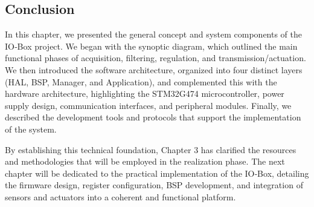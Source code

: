 \subsection{Conclusion}

In this chapter, we presented the general concept and system components of the IO‑Box project. We began with the synoptic diagram, which outlined the main functional phases of acquisition, filtering, regulation, and transmission/actuation. We then introduced the software architecture, organized into four distinct layers (HAL, BSP, Manager, and Application), and complemented this with the hardware architecture, highlighting the STM32G474 microcontroller, power supply design, communication interfaces, and peripheral modules. Finally, we described the development tools and protocols that support the implementation of the system.

By establishing this technical foundation, Chapter 3 has clarified the resources and methodologies that will be employed in the realization phase. The next chapter will be dedicated to the practical implementation of the IO‑Box, detailing the firmware design, register configuration, BSP development, and integration of sensors and actuators into a coherent and functional platform.